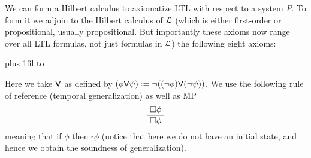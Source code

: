 \eexam

We can form a Hilbert calculus to axiomatize LTL with respect to a system $P$.
To form it we adjoin to the Hilbert calculus of ${\cal L}$ (which is either first-order or propositional, usually propositional. But importantly these axioms now range over all LTL formulas, not just
formulas in ${\cal L}$) the following eight axioms:

\medskip
{\tabskip=0pt plus 1fil
\halign to}
\medskip

Here we take ${\sf V}$ as defined by $(\phi{\sf V}\psi)\mathrel{{\mathop:}{=}}\neg((\neg\phi){\sf V}(\neg\psi))$.
We use the following rule of reference (temporal generalization) as well as MP
$$ \vbox{\halign{\hfil$#$\hfil\cr\square\phi\cr\noalign{\kern2pt\hrule\kern2pt}\ \square\phi\ \cr}} $$
meaning that if $\phi$ then $\square\phi$ (notice that here we do not have an initial state, and hence we obtain the soundness of generalization).

\bye

